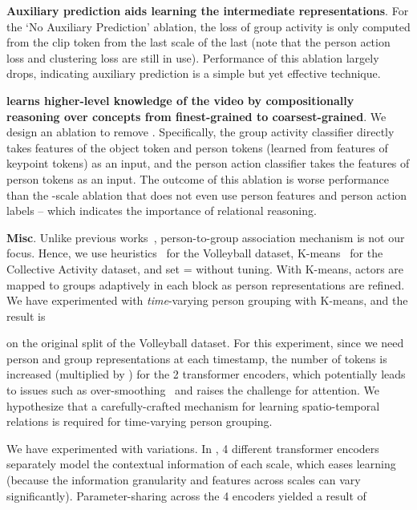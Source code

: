 \documentclass[runningheads]{llncs}
\begin{document}
\noindent \textbf{Auxiliary prediction aids learning the intermediate representations}. For the `No Auxiliary Prediction' ablation, the loss of group activity  
is only
computed from 
the clip 
token from the last scale of the last \mtx (note that the person action loss and clustering loss are still in use).  
Performance of this ablation largely drops, indicating auxiliary prediction is a simple but yet effective technique.



\noindent \textbf{\mtx learns higher-level knowledge of the video by compositionally reasoning over concepts from finest-grained to coarsest-grained}. 
We design an ablation to remove \mtxeos. Specifically, the group activity classifier directly takes features of the object token and person tokens (learned from features of keypoint tokens) as an input, and the person action classifier takes the features of person tokens as an input. 
The outcome of 
this 
ablation is worse performance than the -scale ablation that does not even use person features and person action labels -- which indicates the importance of relational reasoning.






 
\noindent \textbf{Misc}. Unlike previous works~\cite{ehsanpour2020joint,koshkina2021contrastive}, person-to-group association  mechanism
is not our focus. 
Hence, we use heuristics~\cite{GIRN} for the Volleyball dataset, K-means~\cite{GroupFormer} for the Collective Activity dataset,
and set =
without tuning.
With K-means, actors
are mapped to groups
adaptively in each \mtx
block 
as person representations are refined. 
We have experimented with
\textit{time}-varying
person 
grouping 
with K-means, and the result is 
 
on the original split of the Volleyball dataset.  
For this
experiment, 
since we need person and group representations at each timestamp, the number of tokens is increased (multiplied by ) for the 2 transformer encoders, which potentially leads to issues such as over-smoothing~\cite{yuan2021spatio}
and raises the challenge for attention.  
We hypothesize that a carefully-crafted mechanism for learning spatio-temporal relations
is required for time-varying person grouping.

We have experimented with \mtx variations.
In \mtxeos, 4 different transformer
encoders separately model the contextual information of each scale, which eases learning (because the information granularity and features across scales can vary significantly). 
Parameter-sharing across the 4 encoders yielded a result of 
 
\end{document}
